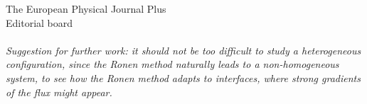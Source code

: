 \documentclass[11pt]{letter} %
\newcommand{\revised}[1]{{\color{red}{#1}}}
\begin{document}
\begin{letter}{The European Physical Journal Plus \\
Editorial board}
\\ \\
\textit{Suggestion for further work: it should not be too difficult to study a heterogeneous configuration, since the Ronen method naturally leads to a non-homogeneous system, to see how the Ronen method adapts to interfaces, where strong gradients of the flux might appear.}
\\ \\
\revised{T}
\\ \\






%

\end{letter}
\end{document}
